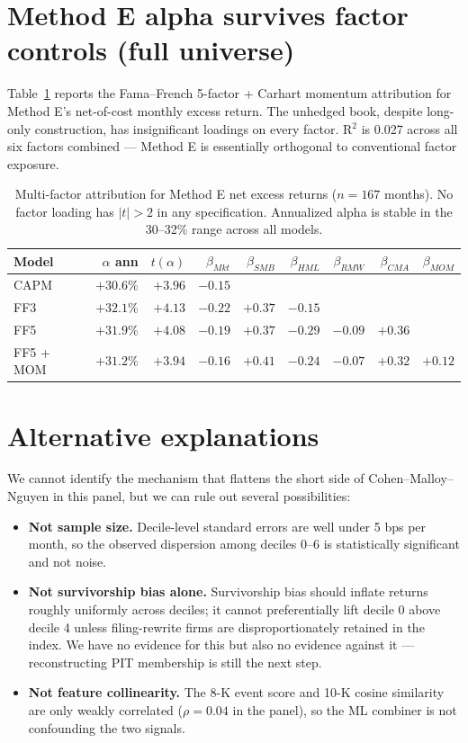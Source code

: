 \documentclass[11pt]{article}
\begin{document}
\section{Method E alpha survives factor controls (full universe)}
\label{sec:methodE}

Table~\ref{tab:ff} reports the Fama--French 5-factor + Carhart momentum
attribution for Method E's net-of-cost monthly excess return. The unhedged
book, despite long-only construction, has insignificant loadings on every
factor. R$^2$ is 0.027 across all six factors combined --- Method E is
essentially orthogonal to conventional factor exposure.

\begin{table}[h]
\centering
\begin{tabular}{lrrrrrrrr}
\toprule
Model & $\alpha$ ann & $t(\alpha)$ & $\beta_{Mkt}$ & $\beta_{SMB}$ & $\beta_{HML}$ & $\beta_{RMW}$ & $\beta_{CMA}$ & $\beta_{MOM}$ \\
\midrule
CAPM      & $+30.6\%$ & $+3.96$ & $-0.15$ &         &         &         &         &         \\
FF3       & $+32.1\%$ & $+4.13$ & $-0.22$ & $+0.37$ & $-0.15$ &         &         &         \\
FF5       & $+31.9\%$ & $+4.08$ & $-0.19$ & $+0.37$ & $-0.29$ & $-0.09$ & $+0.36$ &         \\
FF5 + MOM & $+31.2\%$ & $+3.94$ & $-0.16$ & $+0.41$ & $-0.24$ & $-0.07$ & $+0.32$ & $+0.12$ \\
\bottomrule
\end{tabular}
\caption{Multi-factor attribution for Method E net excess returns ($n=167$
  months). No factor loading has $|t| > 2$ in any specification. Annualized
  alpha is stable in the 30--32\% range across all models.}
\label{tab:ff}
\end{table}

\section{Alternative explanations}

We cannot identify the mechanism that flattens the short side of
Cohen--Malloy--Nguyen in this panel, but we can rule out several possibilities:

\begin{itemize}
\item \textbf{Not sample size.} Decile-level standard errors are well under
  5 bps per month, so the observed dispersion among deciles 0--6 is
  statistically significant and not noise.
\item \textbf{Not survivorship bias alone.} Survivorship bias should
  inflate returns roughly uniformly across deciles; it cannot preferentially
  lift decile 0 above decile 4 unless filing-rewrite firms are
  disproportionately retained in the index. We have no evidence for this
  but also no evidence against it --- reconstructing PIT membership is
  still the next step.
\item \textbf{Not feature collinearity.} The 8-K event score and 10-K
  cosine similarity are only weakly correlated ($\rho = 0.04$ in the panel),
  so the ML combiner is not confounding the two signals.
\end{itemize}
\end{document}
